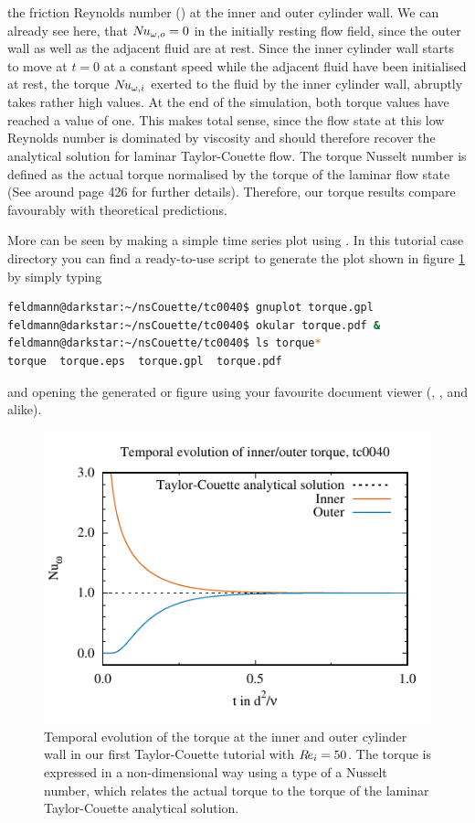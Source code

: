\documentclass[a4paper, 11pt, DIV=11]{scrartcl}
\begin{document}
the friction Reynolds number (\ReTau) at the inner and outer cylinder wall. We can
already see here, that $N\hspace{-0.1em}u_{\omega,o}=0$ in the initially resting flow field, since the
outer wall as well as the adjacent fluid are at rest. Since the inner cylinder
wall starts to move at $t=0$ at a constant speed while the adjacent fluid have
been initialised at rest, the torque $N\hspace{-0.1em}u_{\omega,i}$ exerted to the fluid by the inner
cylinder wall, abruptly takes rather high values. At the end of the simulation,
both torque values have reached a value of one. This makes total sense, since the
flow state at this low Reynolds number is dominated by viscosity and should
therefore recover the analytical solution for laminar Taylor-Couette flow. The
torque Nusselt number is defined as the actual torque normalised by the torque of
the laminar flow state (See %
\eg \cite{Brauckmann2016} around page \num{426} for further details).
Therefore, our torque results compare favourably with theoretical predictions.
\par More can be seen by making a simple time series plot using \eg
\gnuplot. In this tutorial case directory you can find a ready-to-use
script to generate the plot shown in figure \ref{fig:tc0040torque} by simply
typing
\begin{lstlisting}[language=bash]
feldmann@darkstar:~/nsCouette/tc0040$ gnuplot torque.gpl
feldmann@darkstar:~/nsCouette/tc0040$ okular torque.pdf &
feldmann@darkstar:~/nsCouette/tc0040$ ls torque*
torque	torque.eps  torque.gpl	torque.pdf
\end{lstlisting}
and opening the generated  or  figure using your
favourite document  viewer (\eg {}, , 
and alike).
\begin{figure}[htb]
\centering
\includegraphics[scale=1.0, trim=0mm 0mm 0mm 6mm, clip=true]{figures/tc0040/torque}
\caption{Temporal evolution of the torque at the inner and outer cylinder
wall in our first Taylor-Couette tutorial  with $R\hspace{-0.1em}e_{i}=\num{50}$.
The torque is expressed in a non-dimensional way using a type of a Nusselt
number, which relates the actual torque to the torque of the laminar
Taylor-Couette analytical solution.}
\label{fig:tc0040torque}
\end{figure}
\end{document}
